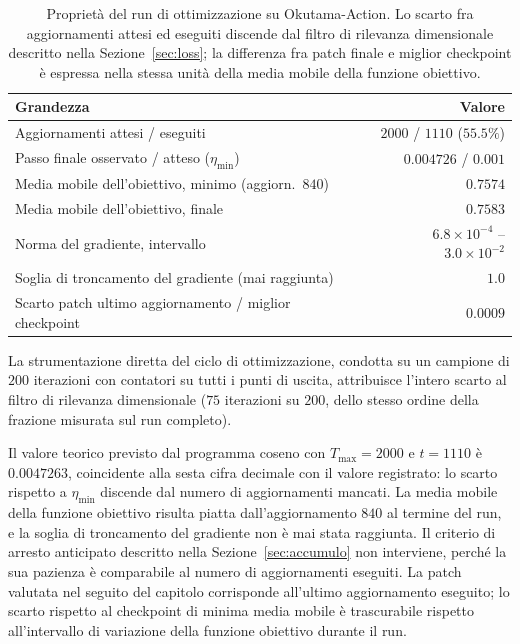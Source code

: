 \ifstampa\documentclass[a4paper,12pt,twoside,openright]{report}\else\documentclass[a4paper,12pt]{report}\fi
\newif\ifrevisione \revisionefalse
\DeclareRobustCommand{\rev}[1]{\ifrevisione{\color{blue!65!black}#1}\else#1\fi}
\begin{document}
\begin{table}[t]
\centering
\small
\begin{tabular}{lr}
\toprule
Grandezza & Valore \\
\midrule
Aggiornamenti attesi / eseguiti & $2000$ / $1110$ ($55.5\%$) \\
Passo finale osservato / atteso ($\eta_{\mathrm{min}}$) & $0.004726$ / $0.001$ \\
Media mobile dell'obiettivo, minimo (aggiorn.\ $840$) & $0.7574$ \\
Media mobile dell'obiettivo, finale & $0.7583$ \\
Norma del gradiente, intervallo & $6.8\times10^{-4}$ -- $3.0\times10^{-2}$ \\
Soglia di troncamento del gradiente (mai raggiunta) & $1.0$ \\
Scarto patch ultimo aggiornamento / miglior checkpoint & $0.0009$ \\
\bottomrule
\end{tabular}
\caption{Proprietà del run di ottimizzazione su Okutama-Action. Lo scarto fra aggiornamenti attesi ed eseguiti discende dal filtro di rilevanza dimensionale descritto nella Sezione~\ref{sec:loss}; la differenza fra patch finale e miglior checkpoint è espressa nella stessa unità della media mobile della funzione obiettivo.}
\label{tab:budget_okutama}
\end{table}

La strumentazione diretta del ciclo di ottimizzazione, condotta su un campione di $200$ iterazioni con contatori su tutti i punti di uscita, attribuisce l'intero scarto al filtro di rilevanza dimensionale ($75$ iterazioni su $200$, dello stesso ordine della frazione misurata sul run completo).

Il \rev{valore teorico previsto} dal programma coseno con $T_{\mathrm{max}}=2000$ e $t=1110$ è $0.0047263$, coincidente alla sesta cifra decimale con il valore registrato: lo scarto rispetto a $\eta_{\mathrm{min}}$ discende dal numero di aggiornamenti mancati. La media mobile della funzione obiettivo risulta piatta dall'aggiornamento $840$ al termine del run, e la soglia di troncamento del gradiente non è mai stata raggiunta. \rev{Il criterio di arresto anticipato descritto nella Sezione~\ref{sec:accumulo} non interviene, perché la sua pazienza è comparabile al numero di aggiornamenti eseguiti.} La patch valutata nel seguito del capitolo corrisponde all'ultimo aggiornamento eseguito; lo scarto rispetto al checkpoint di minima media mobile è trascurabile rispetto all'intervallo di variazione della funzione obiettivo durante il run.
\end{document}

